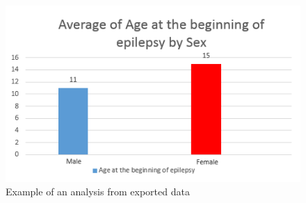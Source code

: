 \documentclass[thesis=B,english]{FITthesis}[2012/10/20]
\begin{document}
\begin{figure}[ht]\centering
\includegraphics[width=0.5\paperwidth]{chart}
		\caption{Example of an analysis from exported data}
\end{figure}
\end{document}
